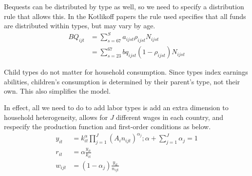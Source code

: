 \documentclass[letterpaper,12pt]{article}
\theoremstyle{definition}
\numberwithin{equation}{section}
\begin{document}
\begin{spacing}{1.5}
	Bequests can be distributed by type as well, so we need to specify a distribution rule that allows this.  In the Kotlikoff papers the rule used specifies that all funds are distributed within types, but may vary by age.
	\begin{align}
		BQ_{ijt} & = \sum_{s=67}^S a_{ijst} \rho_{ijst} N_{ijst} \\
		& = \sum_{s=23}^{67} bq_{ijst} (1-\rho_{ijst}) N_{ijst}
	\end{align}

	Child types do not matter for household consumption.  Since types index earnings abilities, children's consumption is determined by their parent's type, not their own.  This also simplifies the model.

	In effect, all we need to do to add labor types is add an extra dimension to household heterogeneity, allows for $J$ different wages in each country, and respecify the production function and first-order conditions as below.
	\begin{align}
		y_{it} & = k_{it}^\alpha \prod_{j=1}^J \left( A_{i} n_{ijt} \right)^{\alpha_j}; \alpha + \sum_{j=1}^J \alpha_j = 1 \\
		r_{it} & = \alpha \frac{y_{it}}{k_{it}} \\
		w_{ijt} & = (1-\alpha_j) \frac{y_{it}}{n_{ijt}}
	\end{align}


\end{spacing}
\end{document}
